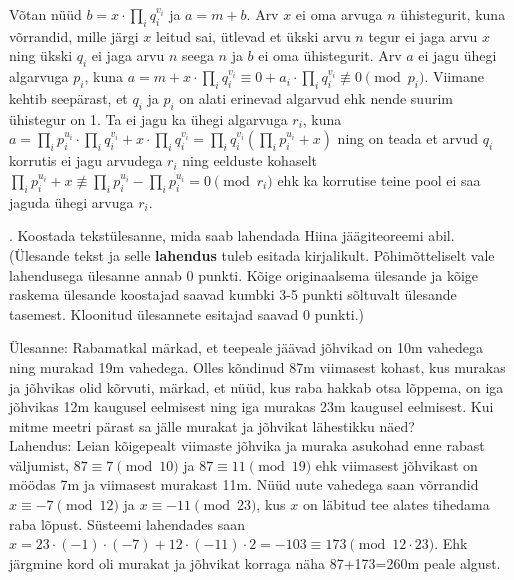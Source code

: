 \documentclass[a4paper, 10pt]{article}
\begin{document}
Võtan nüüd $b=x\cdot\prod_iq_i^{v_i}$ ja $a=m+b$. Arv $x$ ei oma arvuga $n$ ühistegurit, kuna võrrandid, mille järgi $x$ leitud sai, ütlevad et ükski arvu $n$ tegur ei jaga arvu $x$ ning ükski $q_i$ ei jaga arvu $n$ seega $n$ ja $b$ ei oma ühistegurit. Arv $a$ ei jagu ühegi algarvuga $p_i$, kuna $a= m+x\cdot\prod_iq_i^{v_i}\equiv 0+a_i\cdot\prod_iq_i^{v_i}\not\equiv0\pmod{p_i}$. Viimane kehtib seepärast, et $q_i$ ja $p_i$ on alati erinevad algarvud ehk nende suurim ühistegur on 1. Ta ei jagu ka ühegi algarvuga $r_i$, kuna $a=\prod_ip_i^{u_i}\cdot\prod_iq_i^{v_i}+x\cdot\prod_iq_i^{v_i}=\prod_iq_i^{v_i}(\prod_ip_i^{u_i}+x)$ ning on teada et arvud $q_i$ korrutis ei jagu arvudega $r_i$ ning eelduste kohaselt $\prod_ip_i^{u_i}+x\not\equiv\prod_ip_i^{u_i}-\prod_ip_i^{u_i}=0\pmod{r_i}$ ehk ka korrutise teine pool ei saa jaguda ühegi arvuga $r_i$.

\bigskip

. Koostada tekst\"ulesanne, mida saab lahendada Hiina \mbox{j\"a\"agiteoreemi} abil. \\(\"Ulesande tekst ja 
selle {\bf lahendus} tuleb esitada kirjalikult. Põhimõtteliselt vale lahendusega ülesanne annab 0 punkti. K\~oige originaalsema üles\-ande
ja kõige raskema \"ulesande koostajad saavad kumbki 3-5 punkti sõltuvalt ülesande tasemest. Kloonitud \"ulesannete 
esitajad saavad 0 punkti.)

\bigskip
Ülesanne: Rabamatkal märkad, et teepeale jäävad jõhvikad on 10m vahedega ning murakad 19m vahedega. Olles kõndinud 87m viimasest kohast, kus murakas ja jõhvikas olid kõrvuti, märkad, et nüüd, kus raba hakkab otsa lõppema, on iga jõhvikas 12m kaugusel eelmisest ning iga murakas 23m kaugusel eelmisest. Kui mitme meetri pärast sa jälle murakat ja jõhvikat lähestikku näed?\\

Lahendus: Leian kõigepealt viimaste jõhvika ja muraka asukohad enne rabast väljumist, $87\equiv7\pmod{10}$ ja $87\equiv11\pmod{19}$ ehk viimasest jõhvikast on möödas 7m ja viimasest murakast 11m. Nüüd uute vahedega saan võrrandid $x\equiv-7\pmod{12}$ ja $x\equiv-11\pmod{23}$, kus $x$ on läbitud tee alates tihedama raba lõpust. Süsteemi lahendades saan $x=23\cdot(-1)\cdot(-7)+12\cdot(-11)\cdot2=-103\equiv173\pmod{12\cdot23}$. Ehk järgmine kord oli murakat ja jõhvikat korraga näha 87+173=260m peale algust.
\end{document}

